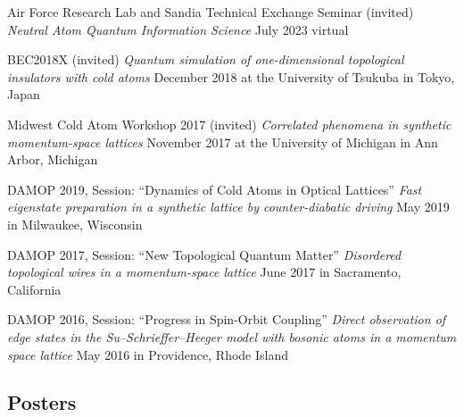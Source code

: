 \documentclass[12pt,letterpaper,sans]{moderncv}
\begin{document}
\begin{etaremune}[topsep=0pt,itemsep=4pt,partopsep=0pt,parsep=0pt]

\item Air Force Research Lab and Sandia Technical Exchange Seminar (invited)
\newline
\emph{Neutral Atom Quantum Information Science}
\newline
July 2023 virtual

\item BEC2018X (invited)
\newline
\emph{Quantum simulation of one-dimensional topological insulators with cold atoms}
\newline
December 2018 at the University of Tsukuba in Tokyo, Japan

\item Midwest Cold Atom Workshop 2017 (invited)
\newline
\emph{Correlated phenomena in synthetic momentum-space lattices}
\newline
November 2017 at the University of Michigan in Ann Arbor, Michigan

\item DAMOP 2019, Session: ``Dynamics of Cold Atoms in Optical Lattices''
\newline
\emph{Fast eigenstate preparation in a synthetic lattice by counter-diabatic driving}
\newline
May 2019 in Milwaukee, Wisconsin

\item DAMOP 2017, Session: ``New Topological Quantum Matter''
\newline
\emph{Disordered topological wires in a momentum-space lattice}
\newline
June 2017 in Sacramento, California

\item DAMOP 2016, Session: ``Progress in Spin-Orbit Coupling''
\newline
\emph{Direct observation of edge states in the Su--Schrieffer--Heeger model with bosonic atoms in a momentum space lattice}
\newline
May 2016 in Providence, Rhode Island

\end{etaremune}

\subsection{Posters}
\end{document}

